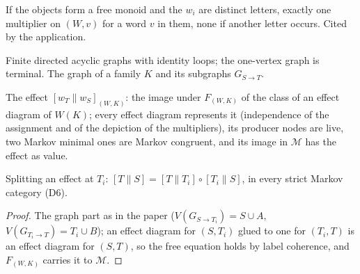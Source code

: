 \begin{remark}[Remark 5.3]
\label{rem:5.3}
\leanok
{}
If the objects form a free monoid and the $w_i$ are distinct letters, exactly one multiplier
on $(W, v)$ for a word $v$ in them, none if another letter occurs. Cited by
the application.
\end{remark}

\begin{definition}
\label{def:5.findag}
\leanok
{}
Finite directed acyclic graphs with identity loops; the one-vertex graph is terminal. The
graph of a family $K$ and its subgraphs $G_{S \to T}$.
\end{definition}

\begin{definition}
\label{def:5.4}
\leanok
{}
The effect $[w_T \| w_S]_{(W,K)}$: the image under $F_{(W,K)}$ of the class of an effect
diagram of $W(K)$; every effect diagram represents it (independence of the assignment and
of the depiction of the multipliers), its producer nodes are live, two Markov minimal ones
are Markov congruent, and its image in $\mathcal M$ has the effect as value.
\end{definition}

\begin{lemma}[Lemma 5.5]
\label{lem:5.5}
\leanok
{}
Splitting an effect at $T_i$: $[T \| S] = [T \| T_i] \circ [T_i \| S]$, in every strict
Markov category (D6).
\end{lemma}
\begin{proof}
\leanok
The graph part as in the paper ($V(G_{S \to T_i}) = S \cup A$, $V(G_{T_i \to T}) = T_i \cup B$);
an effect diagram for $(S, T_i)$ glued to one for $(T_i, T)$ is an effect diagram for
$(S, T)$, so the free equation holds by label coherence, and $F_{(W,K)}$ carries it to
$\mathcal M$.
\end{proof}

